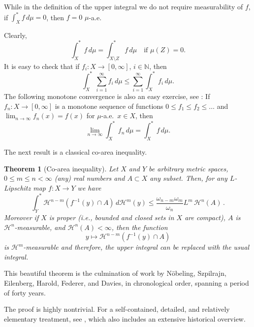\documentclass[12pt,leqno]{amsart}
\newtheorem{theorem}{Theorem}
\theoremstyle{definition}
\newcommand{\bbbn}{\mathbb N}
\def\H{{\mathcal H}}
\numberwithin{theorem}{section} \numberwithin{equation}{section}
\begin{document}
While in the definition of the upper integral we do not require measurability of $f$, if $\int_X^*f\,d\mu=0$, then $f=0$ $\mu$-a.e.

Clearly,
\begin{equation}
\label{Ceq5}
\int_X^*f\, d\mu=\int_{X\setminus Z}^* f\, d\mu
\quad
\text{if } \mu(Z)=0.
\end{equation}
It is easy to check that if $f_i:X\to [0,\infty]$, $i\in\bbbn$, then
$$
\int_X^*\sum_{i=1}^\infty f_i\, d\mu\leq \sum_{i=1}^\infty\int_X^* f_i\, d\mu.
$$
The following monotone convergence is also an easy exercise, see \cite[Lemma~2.2]{EH1}:
If $f_n\colon X\to [0,\infty]$ is a monotone sequence of functions $0\leq f_1\leq f_2\leq\ldots$ and $\lim_{n\to\infty} f_n(x)=f(x)$ for $\mu$-a.e.\ $x\in X$, then
\begin{equation}
\label{Ceq6}
\lim_{n\to\infty} \int_X^*f_n\, d\mu=\int_X^*f\, d\mu.
\end{equation}

The next result is a classical co-area inequality.
\begin{theorem}[Co-area inequality]
\label{CT1}
Let $X$ and $Y$ be arbitrary metric spaces, $0\leq m\leq n<\infty$ (any) real numbers and $A\subset X$ any subset.
Then, for any $L$-Lipschitz map $ f: X \to Y$ we have
$$
\int^*_Y \mathcal{H}^{n-m} \left(f^{-1}(y) \cap A\right)\,  d\mathcal{H}^m (y)  \leq \frac{\omega_{n-m} \omega_m}{\omega_{n}}L^m \,\mathcal{H}^{n}(A) \, .
$$
Moreover if $X$ is proper (i.e., bounded and closed sets in $X$ are compact), $A$ is $\H^n$\nobreakdash-measurable, and $\H^n(A)<\infty$, then the function
$$
y\mapsto \mathcal{H}^{n-m} \left(f^{-1}(y) \cap A\right)
$$
is $\H^m$-measurable and therefore, the upper integral  can be replaced with the usual integral.
\end{theorem}
This beautiful theorem is the culmination of work by N\"obeling, Szpilrajn, Eilenberg, Harold, Federer, and Davies, in chronological order, spanning a period of forty years.

The proof is highly nontrivial. For a self-contained, detailed, and relatively elementary treatment, see \cite{EH1}, which also includes an extensive historical overview.
\end{document}
